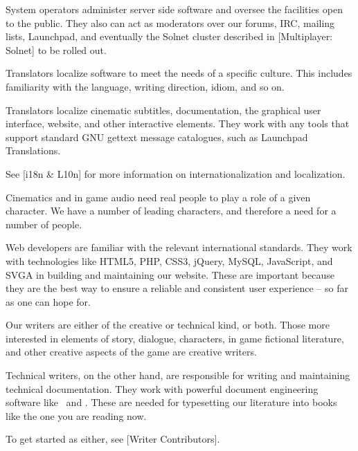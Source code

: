 
System operators administer server side software and oversee the facilities open to the public. They also can act as moderators over our forums, IRC, mailing lists, Launchpad, and eventually the Solnet cluster described in [Multiplayer: Solnet] to be rolled out.


Translators localize software to meet the needs of a specific culture. This includes familiarity with the language, writing direction, idiom, and so on. 

Translators localize cinematic subtitles, documentation, the graphical user interface, website, and other interactive elements. They work with any tools that support standard GNU gettext message catalogues, such as Launchpad Translations. 

See [i18n & L10n] for more information on internationalization and localization.




Cinematics and in game audio need real people to play a role of a given character. We have a number of leading characters, and therefore a need for a number of people.


Web developers are familiar with the relevant international standards. They work with technologies like HTML5, PHP, CSS3, jQuery, MySQL, JavaScript, and SVGA in building and maintaining our website. These are important because they are the best way to ensure a reliable and consistent user experience -- so far as one can hope for.


Our writers are either of the creative or technical kind, or both. Those more interested in elements of story, dialogue, characters, in game fictional literature, and other creative aspects of the game are creative writers.

Technical writers, on the other hand, are responsible for writing and maintaining technical documentation. They work with powerful document engineering software like \BIBTEX\ and \CONTEXT. These are needed for typesetting our literature into books like the one you are reading now.

To get started as either, see [Writer Contributors].

\StopChapter


